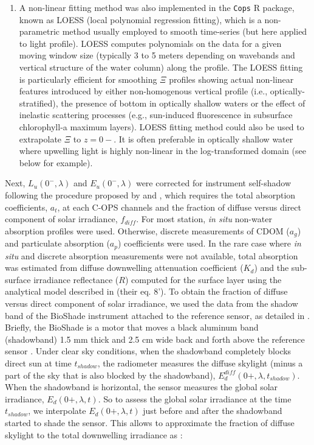 \documentclass[essd, manuscript]{copernicus}
\begin{document}
\begin{enumerate}
    \item A non-linear fitting method was also implemented in the \texttt{Cops} R package, known as LOESS (local polynomial regression fitting), which is a non-parametric method usually employed to smooth time-series (but here applied to light profile). LOESS computes polynomials on the data for a given moving window size (typically 3 to 5 meters depending on wavebands and vertical structure of the water column) along the profile. The LOESS fitting is particularly efficient for smoothing $\Xi$ profiles showing actual non-linear features introduced by either non-homogenous vertical profile (i.e., optically-stratified), the presence of bottom in optically shallow waters or the effect of inelastic scattering processes (e.g., sun-induced fluorescence in subsurface chlorophyll-a maximum layers).  LOESS fitting method could also be used to extrapolate $\Xi$ to $z=0-$. It is often preferable in optically shallow water where upwelling light is highly non-linear in the log-transformed domain (see below for example).  
\end{enumerate}

Next, $L_u(0^-,\lambda)$ and $E_u(0^-,\lambda)$ were corrected for instrument self-shadow following the procedure proposed by \citet{Gordon1992b} and \citet{Zibordi1995}, which requires the total absorption coefficients, $a_t$, at each C-OPS channels and the fraction of diffuse versus direct component of solar irradiance, $f_{diff}$. For most station, \textit{in situ} non-water absorption profiles were used. Otherwise, discrete measurements of CDOM ($a_g$) and particulate absorption ($a_p$) coefficients were used. In the rare case where \textit{in situ} and discrete absorption measurements were not available, total absorption was estimated from diffuse downwelling attenuation coefficient ($K_d$) and the sub-surface irradiance reflectance ($R$) computed for the surface layer using the analytical model described in \citet{Morel2001} (their eq. 8'). To obtain the fraction of diffuse versus direct component of solar irradiance, we used the data from the shadow band of the BioShade instrument attached to the reference sensor, as detailed in \citet{Belanger2017}. 
Briefly, the BioShade is a motor that moves a black aluminum band (shadowband) 1.5 mm thick and  2.5 cm wide back and forth above the reference sensor \citet{Morrow2010}. 
Under clear sky conditions, when the shadowband completely blocks direct sun at time $t_{shadow}$, the radiometer measures the diffuse skylight (minus a part of the sky that is also blocked by the shadowband), $E_d^{diff}(0+,\lambda,t_{shadow})$. When the shadowband is horizontal, the sensor measures the global solar irradiance, $E_d(0+,\lambda,t)$. So to assess the global solar irradiance at the time $t_{shadow}$, we interpolate $E_d(0+,\lambda,t)$ just before and after the shadowband started to shade the sensor. This allows to approximate the fraction of diffuse skylight to the total downwelling irradiance as : 
\end{document}
